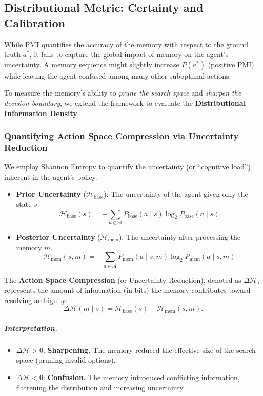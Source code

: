 \subsection{Distributional Metric: Certainty and Calibration}

While PMI quantifies the accuracy of the memory with respect to the ground truth $a^*$, it fails to capture the global impact of memory on the agent's uncertainty. A memory sequence might slightly increase $P(a^*)$ (positive PMI) while leaving the agent confused among many other suboptimal actions.

To measure the memory's ability to \emph{prune the search space} and \emph{sharpen the decision boundary}, we extend the framework to evaluate the \textbf{Distributional Information Density}.

\subsubsection{Quantifying Action Space Compression via Uncertainty Reduction}

We employ Shannon Entropy to quantify the uncertainty (or ``cognitive load'') inherent in the agent's policy.

\begin{itemize}
    \item \textbf{Prior Uncertainty} ($\mathcal{H}_{\text{base}}$): The uncertainty of the agent given only the state $s$.
    \[
    \mathcal{H}_{\text{base}}(s) = - \sum_{a \in \mathcal{A}} P_{\text{base}}(a \mid s) \log_2 P_{\text{base}}(a \mid s)
    \]
    \item \textbf{Posterior Uncertainty} ($\mathcal{H}_{\text{mem}}$): The uncertainty after processing the memory $m$.
    \[
    \mathcal{H}_{\text{mem}}(s, m) = - \sum_{a \in \mathcal{A}} P_{\text{mem}}(a \mid s, m) \log_2 P_{\text{mem}}(a \mid s, m)
    \]
\end{itemize}

The \textbf{Action Space Compression} (or Uncertainty Reduction), denoted as $\Delta \mathcal{H}$, represents the amount of information (in bits) the memory contributes toward resolving ambiguity:
\[
\Delta \mathcal{H}(m \mid s) = \mathcal{H}_{\text{base}}(s) - \mathcal{H}_{\text{mem}}(s, m).
\]

\subparagraph{Interpretation.}
\begin{itemize}
    \item $\Delta \mathcal{H} > 0$: \textbf{Sharpening.} The memory reduced the effective size of the search space (pruning invalid options).
    \item $\Delta \mathcal{H} < 0$: \textbf{Confusion.} The memory introduced conflicting information, flattening the distribution and increasing uncertainty.
\end{itemize}

